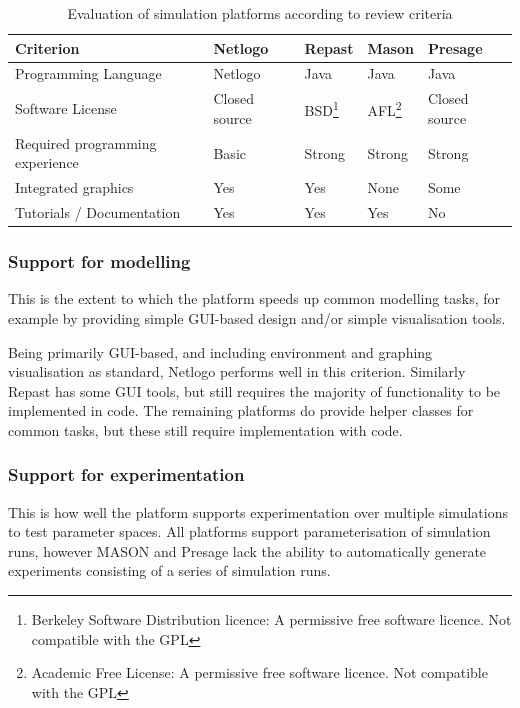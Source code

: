 \begin{table}
\begin{minipage}{1\textwidth}
	\myfloatalign
	\caption{Evaluation of simulation platforms according to review criteria}\label{tab:platformreview}
	\begin{tabularx}{\textwidth}{X|p{}p{}p{}p{}}
	Criterion & Netlogo & Repast & Mason & Presage \\ \midrule
	Programming Language & Netlogo & Java & Java & Java \\
	Software License & Closed source & BSD\footnote{Berkeley Software Distribution licence: A permissive free software licence. Not compatible with the \ac{GPL}} & AFL\footnote{Academic Free License: A permissive free software licence. Not compatible with the \ac{GPL}} & Closed source \\
	Required programming experience & Basic & Strong & Strong & Strong \\
	Integrated graphics & Yes & Yes & None & Some \\
	Tutorials / Documentation & Yes & Yes & Yes & No \\
	\end{tabularx}
\end{minipage}
\end{table}

\subsubsection*{Support for modelling}

This is the extent to which the platform speeds up common modelling tasks, for example by providing simple \ac{GUI}-based design and/or simple visualisation tools.

Being primarily \ac{GUI}-based, and including environment and graphing visualisation as standard, Netlogo performs well in this criterion. Similarly Repast has some \ac{GUI} tools, but still requires the majority of functionality to be implemented in code. The remaining platforms do provide helper classes for common tasks, but these still require implementation with code.

\subsubsection*{Support for experimentation}

This is how well the platform supports experimentation over multiple simulations to test parameter spaces. All platforms support parameterisation of simulation runs, however MASON and Presage lack the ability to automatically generate experiments consisting of a series of simulation runs.

